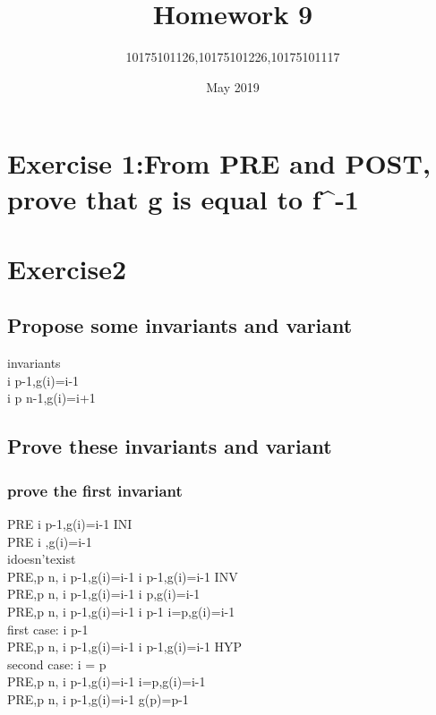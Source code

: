 \documentclass[11pt,a4paper,fleqn]{article}
\title{Homework 9}
\author{10175101126,10175101226,10175101117}
\date{May 2019}
\begin{document}
\maketitle


\section{Exercise 1:From PRE and POST, prove that g is equal to  f^{-1}}
\noindent





\section{Exercise2 }

\subsection{Propose some invariants and variant}
\noindent
invariants \\
\forall i  \upto p-1,g(i)=i-1 \\
\forall i \in p \upto n-1,g(i)=i+1 \\

\subsection{ Prove these invariants and variant}
\subsubsection{prove the first invariant }
\noindent
PRE \vdash [g:=( \{0\} \domsub f)\cup \{n-1 \mapsto n\},p:=1]\forall i  \upto p-1,g(i)=i-1  \;INI \\
PRE \vdash [g:=( \{0\} \domsub f)\cup \{n-1 \mapsto n\}]\forall i  ,g(i)=i-1  \\
i\;doesn't\;exist \\
PRE,p \neq n, \forall i  \upto p-1,g(i)=i-1 \vdash [g(p):=p-1,p:=p+1]\forall i  \upto p-1,g(i)=i-1 \;INV \\
PRE,p \neq n, \forall i  \upto p-1,g(i)=i-1 \vdash [g(p):=p-1]\forall i  \upto p,g(i)=i-1 \\
PRE,p \neq n, \forall i  \upto p-1,g(i)=i-1 \vdash [g(p):=p-1]\forall i  \upto p-1 \cup i=p,g(i)=i-1 \\
first\; case:\; i  \upto p-1 \\
PRE,p \neq n, \forall i  \upto p-1,g(i)=i-1 \vdash [g(p):=p-1]\forall i  \upto p-1,g(i)=i-1 \; HYP \\
second\; case:\; i = p \\
PRE,p \neq n, \forall i  \upto p-1,g(i)=i-1 \vdash [g(p):=p-1]i=p,g(i)=i-1 \\
PRE,p \neq n, \forall i  \upto p-1,g(i)=i-1 \vdash [g(p):=p-1]g(p)=p-1 \\
\end{document}
